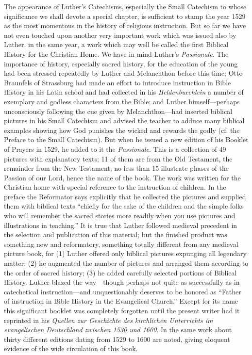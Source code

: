 The appearance of Luther’s Catechisms, especially the Small Catechism to whose significance we shall devote a special chapter, is sufficient to stamp the year 1529 as the most momentous in the history of religious instruction. But so far we have not even touched upon another very important
work which was issued also by Luther, in the same year, a work which may well be called the first Biblical History for the Christian Home. We have in mind Luther’s \emph{Passionale}. The importance of history, especially sacred history, for the education of the young had been stressed repeatedly by Luther and Melanchthon before this time; Otto Braunfels of Strassburg had made an effort to introduce instruction in Bible History in his Latin school and had collected in his \emph{Heldenbuechlein} a number of exemplary and godless characters from the Bible; and Luther himself—perhaps unconsciously following the cue given by Melanchthon—had inserted biblical pictures in his Small Catechism and advised the teacher to adduce many biblical examples showing how God punishes the wicked and rewards the godly (cf. the Preface to the Small Catechism). But when he issued a new edition of his Booklet of Prayers in 1529, he added to it the \emph{Passionale}. This is a collection of 49 pictures with explanatory texts; 11 of them are from the Old Testament, the remainder from the New Testament; no less than 15 illustrate phases of the Passion of our Lord, hence the name of the book. The work was written for the Christian home with special reference to the instruction of children. In the preface the Reformator says explicitly that he collected the pictures and supplied them with biblical texts “chiefly for the sake of the children and the simple folks who will remember the sacred stories more readily when you use pictures and illustrations in teaching.” It is true that Luther followed medieval precedent in the selection and publication of this material; but the finished product was something new and reformatory, something totally different from any medieval picture book, for (1) Luther offered only biblical pictures expunging all legendary matter; (2) he augmented the number of pictures and arranged them according to the order of sacred history; (3) he added carefully selected portions of
Biblical History. Luther blazed the way—though perhaps not quite as successfully as in catechetical instruction—and unquestionably deserves to be honored as “Father of instruction in Bible History in the Evangelical Church.” Except for its name this significant booklet was completely forgotten until the present writer had it reprinted in his \emph{Quellen zur Geschichte des kirchlichen Unterrichts im evangelischen Deutschland zwischen 1530 und 1600}. In the same work about thirty different editions dating from 1529 to 1600 are noted, giving eloquent evidence of the wide circulation of this book.

